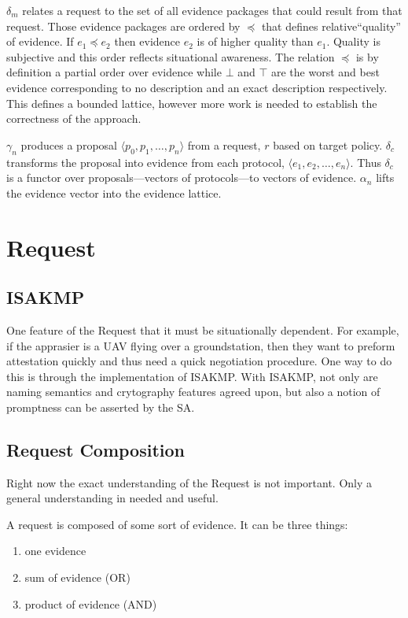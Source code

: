 \documentclass[10pt]{report}
\newcommand{\squash}{\itemsep=0pt\parskip=0pt}
\begin{document}
$\delta_m$ relates a request to the set of all evidence packages that 
could result from that request.  Those evidence packages are ordered
by $\preceq$ that defines relative``quality'' of evidence.  If
$e_1\preceq e_2$ then evidence $e_2$ is of higher quality than $e_1$.
Quality is subjective and this order reflects situational awareness.
The relation $\preceq$ is by definition a partial order 
over evidence while $\bot$ and $\top$ are the worst and best evidence
corresponding to no description and an exact description
respectively.  This defines a bounded lattice, however more work is
needed to establish the correctness of the approach.

$\gamma_n$ produces a proposal $\langle p_0,p_1,\ldots,p_n\rangle$
from a request, $r$ based on target policy. $\delta_c$
transforms the proposal into evidence from each protocol,
$\langle e_1,e_2,\ldots,e_n \rangle$. Thus $\delta_c$ is a functor
over proposals---vectors of protocols---to vectors of evidence.
$\alpha_n$ lifts the evidence vector into the evidence lattice.

\section{Request}

\subsection{ISAKMP}
  
One feature of the Request that it must be situationally
dependent. For example, if the apprasier is a UAV flying over a
groundstation, then they want to preform attestation quickly and thus
need a quick negotiation procedure. One way to do this is through the
implementation of ISAKMP. With ISAKMP, not only are naming semantics
and crytography features agreed upon, but also a notion of promptness can
be asserted by the SA. 

\subsection{Request Composition}
  
  Right now the exact understanding of the Request is not important.
  Only a general understanding in needed and useful. 
  
  A request is composed of some sort of evidence. It can be three things:
  \begin{enumerate}
  \squash
  \item one evidence
  \item sum of evidence (OR)
  \item product of evidence (AND)
  \end{enumerate}
\end{document}
